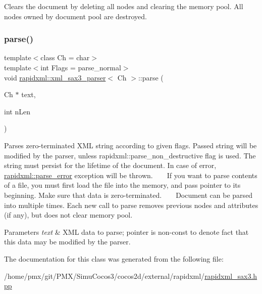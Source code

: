 Clears the document by deleting all nodes and clearing the memory pool. All nodes owned by document pool are destroyed. \mbox{\label{classrapidxml_1_1xml__sax3__parser_a9195e59c16ee5bec5a0d68bea48111fe}} 
\subsubsection{\texorpdfstring{parse()}{parse()}}
{\footnotesize\ttfamily template$<$class Ch  = char$>$ \\
template$<$int Flags = parse\+\_\+normal$>$ \\
void \hyperlink{classrapidxml_1_1xml__sax3__parser}{rapidxml\+::xml\+\_\+sax3\+\_\+parser}$<$ Ch $>$\+::parse (\begin{DoxyParamCaption}\item[{Ch $\ast$}]{text,  }\item[{int}]{n\+Len }\end{DoxyParamCaption})\hspace{0.3cm}{\ttfamily [inline]}}

Parses zero-\/terminated X\+ML string according to given flags. Passed string will be modified by the parser, unless rapidxml\+::parse\+\_\+non\+\_\+destructive flag is used. The string must persist for the lifetime of the document. In case of error, \hyperlink{classrapidxml_1_1parse__error}{rapidxml\+::parse\+\_\+error} exception will be thrown. ~\newline
~\newline
 If you want to parse contents of a file, you must first load the file into the memory, and pass pointer to its beginning. Make sure that data is zero-\/terminated. ~\newline
~\newline
 Document can be parsed into multiple times. Each new call to parse removes previous nodes and attributes (if any), but does not clear memory pool. 
\begin{DoxyParams}{Parameters}
{\em text} & X\+ML data to parse; pointer is non-\/const to denote fact that this data may be modified by the parser. \\
\hline
\end{DoxyParams}


The documentation for this class was generated from the following file\+:\begin{DoxyCompactItemize}
\item 
/home/pmx/git/\+P\+M\+X/\+Simu\+Cocos3/cocos2d/external/rapidxml/\hyperlink{rapidxml__sax3_8hpp}{rapidxml\+\_\+sax3.\+hpp}\end{DoxyCompactItemize}
